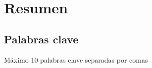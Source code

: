 \chapter*{Resumen}

\section*{\tituloPortadaVal}



\section*{Palabras clave}
   
\noindent Máximo 10 palabras clave separadas por comas

   


